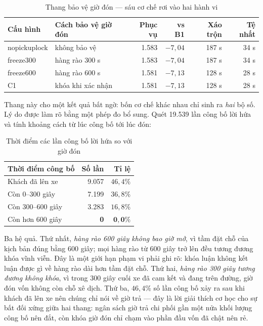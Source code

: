 \begin{table}[htbp]
\centering
\caption{Thang bảo vệ giờ đón --- sáu cơ chế rơi vào hai hành vi}
\label{bang:thang2}
\small
\begin{tabular}{@{}llrrrr@{}}
\toprule
\textbf{Cấu hình} & \textbf{Cách bảo vệ giờ đón} & \textbf{Phục vụ} & \textbf{vs B1} & \textbf{Xáo trộn} & \textbf{Tệ nhất}\\
\midrule
nopickuplock & không bảo vệ & 1.583 & $-7{,}04$ & 187 s & 34 s\\
freeze300 & hàng rào 300 s & 1.583 & $-7{,}04$ & 187 s & 34 s\\
freeze600 & hàng rào 600 s & 1.581 & $-7{,}13$ & 128 s & 28 s\\
C1 & khóa khi xác nhận & 1.581 & $-7{,}13$ & 128 s & 28 s\\
\bottomrule
\end{tabular}
\end{table}

Thang này cho một kết quả bất ngờ: bốn cơ chế khác nhau chỉ sinh ra \emph{hai} bộ số. Lý do được
làm rõ bằng một phép đo bổ sung. Quét 19.539 lần công bố lời hứa và tính khoảng cách từ lúc công
bố tới lúc đón:

\begin{table}[htbp]
\centering
\caption{Thời điểm các lần công bố lời hứa so với giờ đón}
\label{bang:thoidiem}
\small
\begin{tabular}{@{}lrr@{}}
\toprule
\textbf{Thời điểm công bố} & \textbf{Số lần} & \textbf{Tỉ lệ}\\
\midrule
Khách đã lên xe & 9.057 & $46{,}4\%$\\
Còn 0--300 giây & 7.199 & $36{,}8\%$\\
Còn 300--600 giây & 3.283 & $16{,}8\%$\\
Còn hơn 600 giây & \textbf{0} & $\mathbf{0{,}0\%}$\\
\bottomrule
\end{tabular}
\end{table}

Ba hệ quả. Thứ nhất, \emph{hàng rào 600 giây không bao giờ mở}, vì tầm đặt chỗ của kịch bản đúng
bằng 600 giây; mọi hàng rào từ 600 giây trở lên đều tương đương khóa vĩnh viễn. Đây là một giới
hạn phạm vi phải ghi rõ: khóa luận không kết luận được gì về hàng rào dài hơn tầm đặt chỗ. Thứ
hai, \emph{hàng rào 300 giây tương đương không khóa}, vì trong 300 giây cuối xe đã cam kết và
đang trên đường, giờ đón vốn không còn chỗ xê dịch. Thứ ba, $46{,}4\%$ số lần công bố xảy ra sau
khi khách đã lên xe nên chúng chỉ nói về giờ trả --- đây là lời giải thích cơ học cho sự bất đối
xứng giữa hai thang: ngân sách giờ trả chi phối gần một nửa khối lượng công bố nên đắt, còn khóa
giờ đón chỉ chạm vào phần đầu vốn đã chật nên rẻ.

